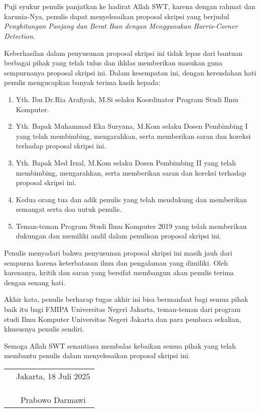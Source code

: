 \chapter*{}

Puji syukur penulis panjatkan ke hadirat Allah SWT, karena dengan rahmat dan
karunia-Nya, penulis dapat menyelesaikan proposal skripsi yang berjudul
\textit{Penghitungan Panjang dan Berat Ikan dengan Menggunakan Harris-Corner Detection}.

Keberhasilan dalam penyusunan proposal skripsi ini tidak lepas dari bantuan
berbagai pihak yang telah tulus dan ikhlas memberikan masukan guna sempurnanya proposal skripsi ini. Dalam kesempatan ini, dengan
kerendahan hati penulis mengucapkan banyak terima kasih kepada:

\begin{enumerate}
	\item Yth. Ibu Dr.Ria Arafiyah, M.Si selaku Koordinator Program Studi Ilmu Komputer.
	\item Yth. Bapak Muhammad Eka Suryana, M.Kom selaku Dosen Pembimbing I yang telah membimbing, mengarahkan, serta memberikan saran dan koreksi terhadap proposal skripsi ini.
	\item Yth. Bapak Med Irzal, M.Kom selaku Dosen Pembimbing II yang telah membimbing, mengarahkan, serta memberikan saran dan koreksi terhadap proposal skripsi ini.
	\item Kedua orang tua dan adik penulis yang telah mendukung dan memberikan semangat serta doa untuk penulis.
	\item Teman-teman Program Studi Ilmu Komputer 2019 yang telah memberikan dukungan dan memiliki andil dalam penulisan proposal skripsi ini.
\end{enumerate}

Penulis menyadari bahwa penyusunan proposal skripsi ini masih jauh dari sempurna
karena keterbatasan ilmu dan pengalaman yang dimiliki. Oleh karenanya, kritik
dan saran yang bersifat membangun akan penulis terima dengan senang hati. 

Akhir kata, penulis berharap tugas akhir ini bisa bermanfaat bagi semua pihak baik itu bagi FMIPA Universitas Negeri Jakarta, teman-teman dari program studi Ilmu
Komputer Universitas Negeri Jakarta dan para pembaca sekalian, khususnya penulis sendiri.

Semoga Allah SWT senantiasa membalas kebaikan semua pihak yang telah membantu penulis dalam menyelesaikan proposal skripsi ini.

\vspace{2cm}

\begin{tabular}{p{7.5cm}c}
	&Jakarta, 18 Juli 2025 \\
	&\\
	&\\
	&\\
	&Prabowo Darmawi
\end{tabular}
